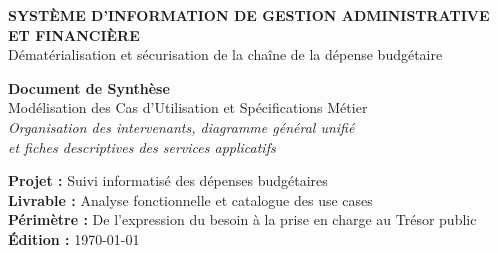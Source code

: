 \documentclass[11pt,a4paper]{article}
\begin{document}
\begin{titlepage}
\thispagestyle{empty}

\vspace*{2.0cm}

\begin{center}
  {\large\sffamily\bfseries\color{BleuInstitutionnel} SYSTÈME D'INFORMATION DE GESTION ADMINISTRATIVE ET FINANCIÈRE}\\[0.25cm]
  {\normalsize\sffamily\color{GrisFonce} Dématérialisation et sécurisation de la chaîne de la dépense budgétaire}

  \vspace{3.5cm}

  {\fontsize{26}{32}\selectfont\sffamily\bfseries\color{BleuInstitutionnel} Document de Synthèse}\\[0.6cm]
  {\fontsize{16}{22}\selectfont\sffamily\color{BleuSecondaire} Modélisation des Cas d'Utilisation et Spécifications Métier}\\[1.2cm]

  {\normalsize\itshape\color{GrisFonce}
    Organisation des intervenants, diagramme général unifié\\
    et fiches descriptives des services applicatifs
  }

  \vfill

  \begin{minipage}{0.85\linewidth}
    \centering\small\sffamily\color{GrisFonce}
    \textbf{Projet :} Suivi informatisé des dépenses budgétaires\\[0.15cm]
    \textbf{Livrable :} Analyse fonctionnelle et catalogue des use cases\\[0.15cm]
    \textbf{Périmètre :} De l'expression du besoin à la prise en charge au Trésor public\\[0.15cm]
    \textbf{Édition :} \today
  \end{minipage}

  \vspace{1.5cm}
\end{center}

\end{titlepage}

\newpage

\end{document}
